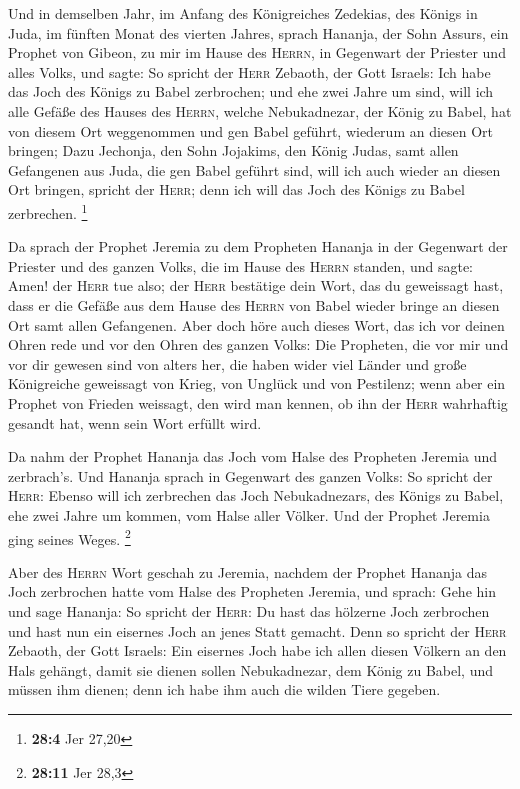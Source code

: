  Und in demselben Jahr, im Anfang des Königreiches
Zedekias, des Königs in Juda, im fünften Monat des vierten Jahres,
sprach Hananja, der Sohn Assurs, ein Prophet von Gibeon, zu mir im Hause
des \textsc{Herrn}, in Gegenwart der Priester und alles Volks, und
sagte:  So spricht der \textsc{Herr} Zebaoth, der Gott
Israels: Ich habe das Joch des Königs zu Babel zerbrochen;
 und ehe zwei Jahre um sind, will ich alle Gefäße des
Hauses des \textsc{Herrn}, welche Nebukadnezar, der König zu Babel, hat
von diesem Ort weggenommen und gen Babel geführt, wiederum an diesen Ort
bringen;  Dazu Jechonja, den Sohn Jojakims, den König
Judas, samt allen Gefangenen aus Juda, die gen Babel geführt sind, will
ich auch wieder an diesen Ort bringen, spricht der \textsc{Herr}; denn
ich will das Joch des Königs zu Babel zerbrechen. \footnote{\textbf{28:4}
  Jer 27,20}

 Da sprach der Prophet Jeremia zu dem Propheten Hananja in
der Gegenwart der Priester und des ganzen Volks, die im Hause des
\textsc{Herrn} standen,  und sagte: Amen! der
\textsc{Herr} tue also; der \textsc{Herr} bestätige dein Wort, das du
geweissagt hast, dass er die Gefäße aus dem Hause des \textsc{Herrn} von
Babel wieder bringe an diesen Ort samt allen Gefangenen. 
Aber doch höre auch dieses Wort, das ich vor deinen Ohren rede und vor
den Ohren des ganzen Volks:  Die Propheten, die vor mir
und vor dir gewesen sind von alters her, die haben wider viel Länder und
große Königreiche geweissagt von Krieg, von Unglück und von Pestilenz;
 wenn aber ein Prophet von Frieden weissagt, den wird man
kennen, ob ihn der \textsc{Herr} wahrhaftig gesandt hat, wenn sein Wort
erfüllt wird.

 Da nahm der Prophet Hananja das Joch vom Halse des
Propheten Jeremia und zerbrach's.  Und Hananja sprach in
Gegenwart des ganzen Volks: So spricht der \textsc{Herr}: Ebenso will
ich zerbrechen das Joch Nebukadnezars, des Königs zu Babel, ehe zwei
Jahre um kommen, vom Halse aller Völker. Und der Prophet Jeremia ging
seines Weges. \footnote{\textbf{28:11} Jer 28,3}

 Aber des \textsc{Herrn} Wort geschah zu Jeremia, nachdem
der Prophet Hananja das Joch zerbrochen hatte vom Halse des Propheten
Jeremia, und sprach:  Gehe hin und sage Hananja: So
spricht der \textsc{Herr}: Du hast das hölzerne Joch zerbrochen und hast
nun ein eisernes Joch an jenes Statt gemacht.  Denn so
spricht der \textsc{Herr} Zebaoth, der Gott Israels: Ein eisernes Joch
habe ich allen diesen Völkern an den Hals gehängt, damit sie dienen
sollen Nebukadnezar, dem König zu Babel, und müssen ihm dienen; denn ich
habe ihm auch die wilden Tiere gegeben.

